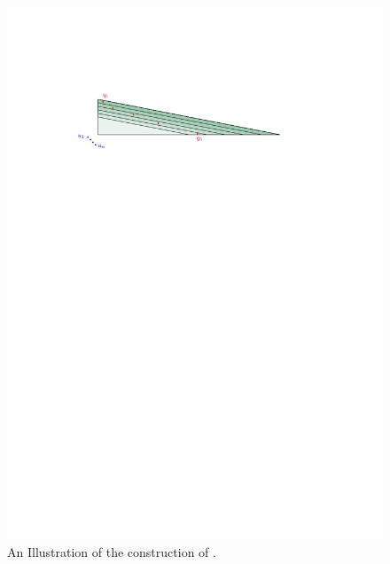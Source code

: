 \begin{figure}[b]
    \centering \includegraphics{figs/triangle_lower_bound}
    \caption{An Illustration of the construction of
       .}
\end{figure}

